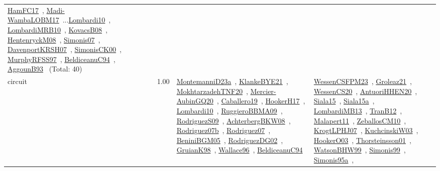 {\begin{longtable}{p{3cm}r>{\raggedright\arraybackslash}p{6cm}>{\raggedright\arraybackslash}p{6cm}>{\raggedright\arraybackslash}p{8cm}}
\href{../works/HamFC17.pdf}{HamFC17}~\cite{HamFC17}, \href{../works/Madi-WambaLOBM17.pdf}{Madi-WambaLOBM17}~\cite{Madi-WambaLOBM17}...\href{../works/Lombardi10.pdf}{Lombardi10}~\cite{Lombardi10}, \href{../works/LombardiMRB10.pdf}{LombardiMRB10}~\cite{LombardiMRB10}, \href{../works/KovacsB08.pdf}{KovacsB08}~\cite{KovacsB08}, \href{../works/HentenryckM08.pdf}{HentenryckM08}~\cite{HentenryckM08}, \href{../works/Simonis07.pdf}{Simonis07}~\cite{Simonis07}, \href{../works/DavenportKRSH07.pdf}{DavenportKRSH07}~\cite{DavenportKRSH07}, \href{../works/SimonisCK00.pdf}{SimonisCK00}~\cite{SimonisCK00}, \href{../works/MurphyRFSS97.pdf}{MurphyRFSS97}~\cite{MurphyRFSS97}, \href{../works/BeldiceanuC94.pdf}{BeldiceanuC94}~\cite{BeldiceanuC94}, \href{../works/AggounB93.pdf}{AggounB93}~\cite{AggounB93} (Total: 40)\\
\index{circuit}\index{Constraints!circuit}circuit &  1.00 & \href{../works/MontemanniD23a.pdf}{MontemanniD23a}~\cite{MontemanniD23a}, \href{../works/KlankeBYE21.pdf}{KlankeBYE21}~\cite{KlankeBYE21}, \href{../works/MokhtarzadehTNF20.pdf}{MokhtarzadehTNF20}~\cite{MokhtarzadehTNF20}, \href{../works/Mercier-AubinGQ20.pdf}{Mercier-AubinGQ20}~\cite{Mercier-AubinGQ20}, \href{../works/Caballero19.pdf}{Caballero19}~\cite{Caballero19}, \href{../works/HookerH17.pdf}{HookerH17}~\cite{HookerH17}, \href{../works/Lombardi10.pdf}{Lombardi10}~\cite{Lombardi10}, \href{../works/RuggieroBBMA09.pdf}{RuggieroBBMA09}~\cite{RuggieroBBMA09}, \href{../works/RodriguezS09.pdf}{RodriguezS09}~\cite{RodriguezS09}, \href{../works/AchterbergBKW08.pdf}{AchterbergBKW08}~\cite{AchterbergBKW08}, \href{../works/Rodriguez07b.pdf}{Rodriguez07b}~\cite{Rodriguez07b}, \href{../works/Rodriguez07.pdf}{Rodriguez07}~\cite{Rodriguez07}, \href{../works/BeniniBGM05.pdf}{BeniniBGM05}~\cite{BeniniBGM05}, \href{../works/RodriguezDG02.pdf}{RodriguezDG02}~\cite{RodriguezDG02}, \href{../works/GruianK98.pdf}{GruianK98}~\cite{GruianK98}, \href{../works/Wallace96.pdf}{Wallace96}~\cite{Wallace96}, \href{../works/BeldiceanuC94.pdf}{BeldiceanuC94}~\cite{BeldiceanuC94} & \href{../works/WessenCSFPM23.pdf}{WessenCSFPM23}~\cite{WessenCSFPM23}, \href{../works/Groleaz21.pdf}{Groleaz21}~\cite{Groleaz21}, \href{../works/WessenCS20.pdf}{WessenCS20}~\cite{WessenCS20}, \href{../works/AntuoriHHEN20.pdf}{AntuoriHHEN20}~\cite{AntuoriHHEN20}, \href{../works/Siala15.pdf}{Siala15}~\cite{Siala15}, \href{../works/Siala15a.pdf}{Siala15a}~\cite{Siala15a}, \href{../works/LombardiMB13.pdf}{LombardiMB13}~\cite{LombardiMB13}, \href{../works/TranB12.pdf}{TranB12}~\cite{TranB12}, \href{../works/Malapert11.pdf}{Malapert11}~\cite{Malapert11}, \href{../works/ZeballosCM10.pdf}{ZeballosCM10}~\cite{ZeballosCM10}, \href{../works/KrogtLPHJ07.pdf}{KrogtLPHJ07}~\cite{KrogtLPHJ07}, \href{../works/KuchcinskiW03.pdf}{KuchcinskiW03}~\cite{KuchcinskiW03}, \href{../works/HookerO03.pdf}{HookerO03}~\cite{HookerO03}, \href{../works/Thorsteinsson01.pdf}{Thorsteinsson01}~\cite{Thorsteinsson01}, \href{../works/WatsonBHW99.pdf}{WatsonBHW99}~\cite{WatsonBHW99}, \href{../works/Simonis99.pdf}{Simonis99}~\cite{Simonis99}, \href{../works/Simonis95a.pdf}{Simonis95a}~\cite{Simonis95a}, 
\end{longtable}}
